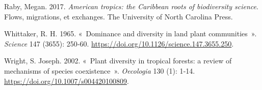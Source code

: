 \documentclass[
  french,
  11pt,
]{stylisharticle}
\newlength{\cslhangindent}
\newenvironment{CSLReferences}[2] %
 {\begin{list}{}{%
  \setlength{\itemindent}{0pt}
  \setlength{\leftmargin}{0pt}
  \setlength{\parsep}{0pt}
  \ifodd #1
   \setlength{\leftmargin}{\cslhangindent}
   \setlength{\itemindent}{-1\cslhangindent}
  \fi
  \setlength{\itemsep}{#2\baselineskip}}}
 {\end{list}}
\begin{document}
\begin{CSLReferences}{1}{1}
Raby, Megan. 2017. \emph{American tropics: the Caribbean roots of
biodiversity science}. Flows, migrations, et exchanges. The University
of North Carolina Press.

Whittaker, R. H. 1965. {«~Dominance and diversity in land plant
communities~»}. \emph{Science} 147 (3655): 250‑60.
\url{https://doi.org/10.1126/science.147.3655.250}.

Wright, S. Joseph. 2002. {«~Plant diversity in tropical forests: a
review of mechanisms of species coexistence~»}. \emph{Oecologia} 130
(1): 1‑14. \url{https://doi.org/10.1007/s004420100809}.

\end{CSLReferences}
\end{document}
